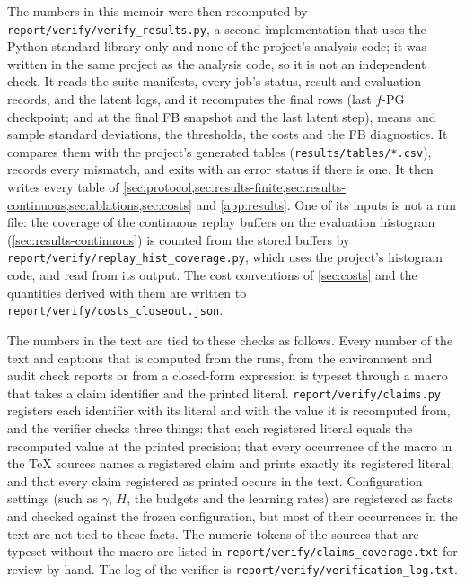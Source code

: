The numbers in this memoir were then recomputed by \nolinkurl{report/verify/verify_results.py}, a second implementation that uses the Python standard library only and none of the project's analysis code; it was written in the same project as the analysis code, so it is not an independent check.
It reads the suite manifests, every job's status, result and evaluation records, and the \DMFB{} latent logs, and it recomputes the final rows (last $f$-PG checkpoint; \ERFB{} and \DMFB{} at the final FB snapshot and the last latent step), means and sample standard deviations, the thresholds, the costs and the FB diagnostics.
It compares them with the project's generated tables (\texttt{results/tables/*.csv}), records every mismatch, and exits with an error status if there is one.
It then writes every table of \cref{sec:protocol,sec:results-finite,sec:results-continuous,sec:ablations,sec:costs} and \cref{app:results}.
One of its inputs is not a run file: the coverage of the continuous replay buffers on the evaluation histogram (\cref{sec:results-continuous}) is counted from the stored buffers by \nolinkurl{report/verify/replay_hist_coverage.py}, which uses the project's histogram code, and read from its output. The cost conventions of \cref{sec:costs} and the quantities derived with them are written to \nolinkurl{report/verify/costs_closeout.json}.

The numbers in the text are tied to these checks as follows.
Every number of the text and captions that is computed from the runs, from the environment and audit check reports or from a closed-form expression is typeset through a macro that takes a claim identifier and the printed literal.
\texttt{report/verify/claims.py} registers each identifier with its literal and with the value it is recomputed from, and the verifier checks three things: that each registered literal equals the recomputed value at the printed precision; that every occurrence of the macro in the TeX sources names a registered claim and prints exactly its registered literal; and that every claim registered as printed occurs in the text.
Configuration settings (such as $\gamma$, $H$, the budgets and the learning rates) are registered as facts and checked against the frozen configuration, but most of their occurrences in the text are not tied to these facts.
The numeric tokens of the sources that are typeset without the macro are listed in \texttt{report/verify/claims\_coverage.txt} for review by hand.
The log of the verifier is \texttt{report/verify/verification\_log.txt}.

